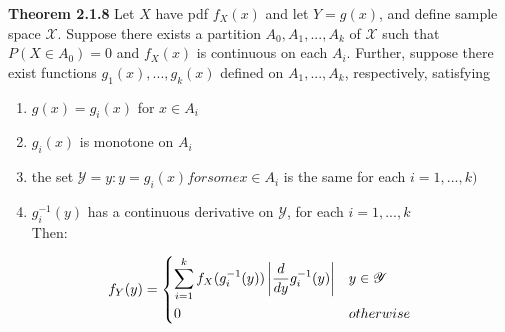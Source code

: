 \documentclass[14pt, oneside, letterpaper]{notes}
\begin{document}
\begin{remark}
	\textbf{Theorem 2.1.8} Let $X$ have pdf $f_X(x)$ and let $Y = g(x)$, 
	and define sample space $\mathscr{X}$.  Suppose there exists a 
	partition $A_0, A_1, ..., A_k$ of $\mathscr{X}$ such that
	$P(X \in A_0)=0$ and $f_X(x)$ is continuous on each $A_i$.  Further,
	suppose there exist functions $g_1(x),...,g_k(x)$ defined on 
	$A_1,...,A_k$, respectively, satisfying
	\begin{enumerate}
		\item $g(x) = g_i(x)$ for $x \in A_i$
		\item $g_i(x)$ is monotone on $A_i$
		\item the set $\mathscr{Y} = {y: y=g_i(x) for some x \in A_i}$
		is the same for each $i=1,...,k)$
		\item $g_i^{-1}(y)$ has a continuous derivative on $\mathscr{Y}$,
		for each $i=1,...,k$ \\
		Then:
	\end{enumerate}
	\[ f_Y(y) =  
		\begin{dcases}
			\sum_{i=1}^{k}f_X(g_i^{-1}(y)) \left| 
			\frac{d}{dy}g_i^{-1}(y)\right| 
			& y \in \mathscr{Y} \\
			0 & otherwise
		\end{dcases}	
	\]
	
\end{remark}
\end{document}
